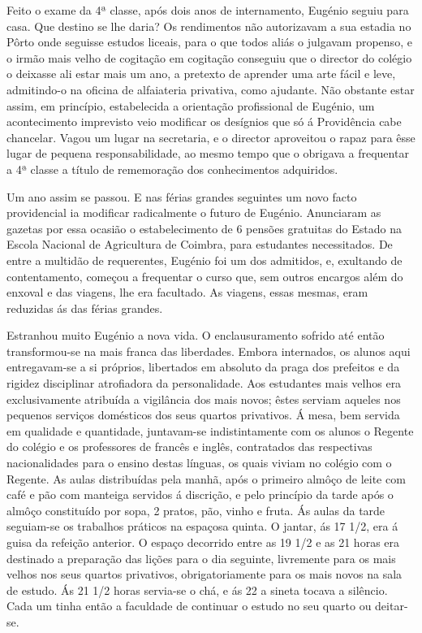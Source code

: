 \documentclass[9pt]{article}
\begin{document}
Feito o exame da 4ª classe, após dois anos de internamento, Eugé\-nio
seguiu para casa. Que destino se lhe daria? Os rendimentos não autorizavam a sua estadia no Pôrto onde seguisse estudos liceais, para o que
todos aliás o julgavam propenso, e o irmão mais ve\-lho de cogita\-ção em cogita\-ção conseguiu que o director do colégio o deixasse ali estar mais
um ano, a pretexto de aprender uma arte fácil e leve, admi\-tin\-\mbox{do-o} na oficina de alfaiateria privativa, como ajudante. Não obstante estar assim,
em princípio, estabelecida a orienta\-ção profissional de Eugé\-nio, um acontecimento imprevisto veio modifi\-car os desígnios que só á Providên\-cia
cabe chancelar. Vagou um lugar na secretaria, e o director aproveitou o
rapaz para êsse lugar de pequena responsabilidade, ao mesmo tempo que o
obrigava a frequentar a 4ª classe a título de rememora\-ção dos conhecimentos adquiridos.

Um ano assim se passou. E nas férias gran\-des seguintes um novo
facto providencial ia modifi\-car radicalmente o futuro de Eugé\-nio.
Anunciaram as gazetas por essa ocasião o estabelecimento de 6 pensões
gratuitas do Estado na Escola Nacional de Agricultura de Coimbra, para
estudantes necessitados. De entre a multidão de requerentes, Eugé\-nio foi
um dos admitidos, e, exultando de contentamento, começou a frequentar o
curso que, sem outros encargos além do enxoval e das viagens, lhe era facultado. As viagens, essas mesmas, eram reduzidas ás das férias gran\-des.

Estranhou muito Eugé\-nio a nova vida. O enclausuramento sofrido até
então transformou-se na mais franca das liberdades. Embora internados,
os alunos aqui entregavam-se a si próprios, libertados em absoluto da
praga dos prefeitos e da rigidez disciplinar atrofiadora da personalidade. Aos estudantes mais ve\-lhos era exclusivamente atribuída a vigilância dos mais novos; êstes serviam aqueles nos pequenos serviços domésticos dos seus quartos privativos. Á mesa, bem servida em qualidade
e quantidade, juntavam-se indistintamente com os alunos o Regente do colégio e os professores de francês e inglês, contratados das respectivas
na\-cio\-nalidades para o ensino destas línguas, os quais viviam no colégio
com o Regente. As aulas distribuídas pela manhã, após o primeiro almôço
de leite com café e pão com manteiga servidos á discri\-ção, e pelo
princípio da tarde após o almôço constituído por sopa, 2 pratos, pão, vinho
e fruta. Ás aulas da tarde seguiam-se os traba\-lhos práticos na espaçosa
quinta. O jantar, ás 17 1/2, era á guisa da refei\-ção anterior.
O espaço decorrido entre as 19 1/2 e as 21 horas era destinado a prepara\-ção das li\-ções para o dia seguinte, livremente para os mais ve\-lhos nos
seus quartos privativos, obrigatoriamente para os mais novos na sala de
estudo. Ás 21 1/2 horas servia-se o chá, e ás 22 a sineta tocava a silêncio.
Cada um tinha então a faculdade de continuar o estudo no seu quarto ou
deitar-se.
\end{document}
